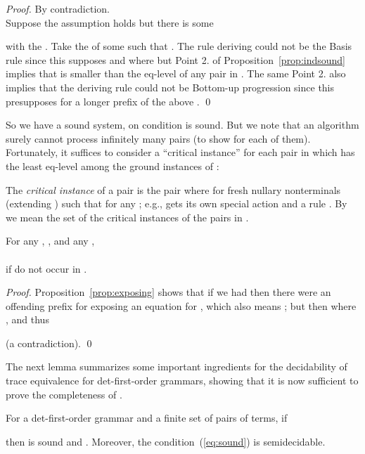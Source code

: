 \documentclass[12pt]{article}
\begin{document}
\begin{proof}
By contradiction.
\\
Suppose the assumption holds but there is some

with the {}.
Take the {}  
of some  such that 
. 
The rule deriving 
could not be the Basis rule since
this supposes  and 
where  but 
 Point 2. of Proposition~\ref{prop:indsound} implies that
 is smaller than the eq-level of any pair in
.
The same Point 2. also implies that 
the deriving rule could not be Bottom-up
progression since this presupposes 
for 
a longer prefix  of the above .
\qed
\end{proof}

\noindent
So we have a sound system, on condition  is sound.
But we note that an algorithm surely cannot process infinitely many
pairs   (to show 
 for each of them).
Fortunately, it suffices to consider a ``critical instance'' for each pair
 in
 which has the least eq-level among
the ground instances of :

\begin{defn}
The \emph{critical instance} of a pair 
  is the pair 
   where 
for fresh 
nullary nonterminals  (extending ) such that 
 for any ; e.g.,  gets its own
special action  and a rule .
By  we mean the set of the critical instances of
the pairs in . 
\end{defn}


\begin{prop}\label{prop:worstinstance}
For any , , and any ,
\\

\\
if 
do not occur in .
\end{prop}

\begin{proof}
Proposition~\ref{prop:exposing} shows that if we had
 then there were an offending prefix
 for   exposing an equation
 for
, which also means ; but then  where ,
and thus

(a contradiction).
\qed
\end{proof}


\noindent
The next lemma summarizes some important ingredients for the decidability
of trace equivalence for det-first-order grammars, showing that it
is now sufficient to
prove
the completeness of .

\begin{lemma}
For a det-first-order grammar  and a finite set
 of pairs of
terms, if

then  is sound and .
Moreover, the condition~\mbox{\textnormal{(\ref{eq:sound})}} 
is semidecidable.
\end{lemma}
\end{document}
